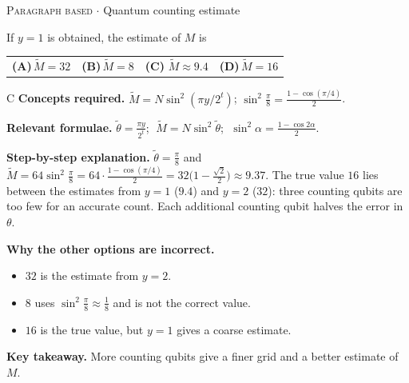 \documentclass[11pt,a4paper]{article}
\newcommand{\optlabel}[1]{\textbf{(#1)}}
\newcommand{\correctlabel}[1]{\textcolor{okgreen}{\textbf{(#1)}\,\ding{51}}}
\newenvironment{qitem}[1]{\begin{list}{}{\setlength{\leftmargin}{3.3em}\setlength{\labelwidth}{3.1em}%
  \setlength{\labelsep}{0.2em}\setlength{\topsep}{3pt}\setlength{\parsep}{3pt}}\item[\textbf{Q.#1}\hfill]}{\end{list}}
\newcommand{\qsep}{\par\vspace{2pt}{\color{black!15}\hrule}\vspace{4pt}}
\newcommand{\qmeta}[2]{{\footnotesize\color{black!60}\textsc{#1} \;$\cdot$\; #2}\par}
\begin{document}
\begin{qitem}{80}
\qmeta{Paragraph based}{Quantum counting estimate}
If $y = 1$ is obtained, the estimate of $M$ is
\par\smallskip\noindent\begin{tabularx}{\linewidth}{@{}*{4}{L}@{}}
\optlabel{A}\,$\tilde M = 32$ & \optlabel{B}\,$\tilde M = 8$ & \correctlabel{C}\,$\tilde M \approx 9.4$ & \optlabel{D}\,$\tilde M = 16$
\end{tabularx}
\end{qitem}
\begin{solbox}{C}
\textbf{\color{brand}Concepts required.} $\tilde M = N\sin^2(\pi y/2^t)$; $\sin^2\frac\pi8 = \frac{1 - \cos(\pi/4)}{2}$.

\textbf{\color{brand}Relevant formulae.} $\tilde\theta = \frac{\pi y}{2^t}$; $\;\tilde M = N\sin^2\tilde\theta$; $\;\sin^2\alpha = \frac{1 - \cos2\alpha}{2}$.

\textbf{\color{brand}Step-by-step explanation.} $\tilde\theta = \frac\pi8$ and $\tilde M = 64\sin^2\frac\pi8 = 64\cdot\frac{1 - \cos(\pi/4)}{2} = 32\big(1 - \frac{\sqrt2}{2}\big) \approx 9.37$. The true value $16$ lies between the estimates from $y = 1$ ($9.4$) and $y = 2$ ($32$): three counting qubits are too few for an accurate count.
Each additional counting qubit halves the error in $\theta$.

\textbf{\color{brand}Why the other options are incorrect.}
\begin{itemize}[leftmargin=2.4em, itemsep=1pt, topsep=2pt]
\item[\textbf{(A)}] $32$ is the estimate from $y = 2$.
\item[\textbf{(B)}] $8$ uses $\sin^2\frac\pi8 \approx \frac18$ and is not the correct value.
\item[\textbf{(D)}] $16$ is the true value, but $y = 1$ gives a coarse estimate.
\end{itemize}
\textbf{\color{brand}Key takeaway.} More counting qubits give a finer grid and a better estimate of $M$.
\end{solbox}
\qsep
\end{document}
